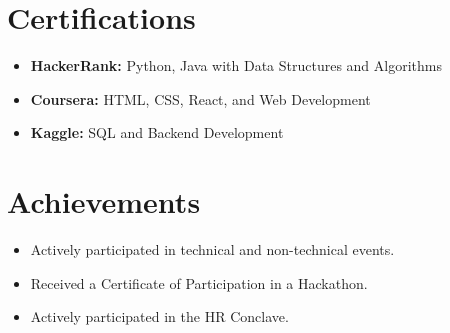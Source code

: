 \documentclass[a4paper,10pt]{article}
\begin{document}
	\section{Certifications}
	\begin{itemize}
		\item \textbf{HackerRank:} Python, Java with Data Structures and Algorithms
		\item \textbf{Coursera:} HTML, CSS, React, and Web Development
		\item \textbf{Kaggle:} SQL and Backend Development
	\end{itemize}
	
	\section{Achievements}
	\begin{itemize}
		\item Actively participated in technical and non-technical events.
		\item Received a Certificate of Participation in a Hackathon.
		\item Actively participated in the HR Conclave.
	\end{itemize}
	
\end{document}
